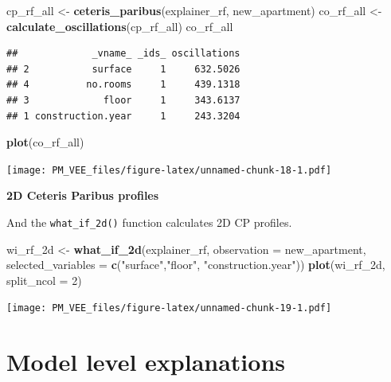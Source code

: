 \documentclass[]{book}
\newenvironment{Shaded}{\begin{snugshade}}{\end{snugshade}}
\newcommand{\DataTypeTok}[1]{\textcolor[rgb]{0.13,0.29,0.53}{#1}}
\newcommand{\DecValTok}[1]{\textcolor[rgb]{0.00,0.00,0.81}{#1}}
\newcommand{\KeywordTok}[1]{\textcolor[rgb]{0.13,0.29,0.53}{\textbf{#1}}}
\newcommand{\NormalTok}[1]{#1}
\newcommand{\StringTok}[1]{\textcolor[rgb]{0.31,0.60,0.02}{#1}}
\theoremstyle{definition}
\theoremstyle{definition}
\theoremstyle{definition}
\theoremstyle{remark}
\begin{document}
\begin{Shaded}
\begin{Highlighting}[]
\NormalTok{cp_rf_all <-}\StringTok{ }\KeywordTok{ceteris_paribus}\NormalTok{(explainer_rf, new_apartment)}
\NormalTok{co_rf_all <-}\StringTok{ }\KeywordTok{calculate_oscillations}\NormalTok{(cp_rf_all)}
\NormalTok{co_rf_all}
\end{Highlighting}
\end{Shaded}

\begin{verbatim}
##             _vname_ _ids_ oscillations
## 2           surface     1     632.5026
## 4          no.rooms     1     439.1318
## 3             floor     1     343.6137
## 1 construction.year     1     243.3204
\end{verbatim}

\begin{Shaded}
\begin{Highlighting}[]
\KeywordTok{plot}\NormalTok{(co_rf_all)}
\end{Highlighting}
\end{Shaded}

\texttt{[image: PM\_VEE\_files/figure-latex/unnamed-chunk-18-1.pdf]}

\textbf{2D Ceteris Paribus profiles}

And the \texttt{what\_if\_2d()} function calculates 2D CP profiles.

\begin{Shaded}
\begin{Highlighting}[]
\NormalTok{wi_rf_2d <-}\StringTok{ }\KeywordTok{what_if_2d}\NormalTok{(explainer_rf, }\DataTypeTok{observation =}\NormalTok{ new_apartment, }
                 \DataTypeTok{selected_variables =} \KeywordTok{c}\NormalTok{(}\StringTok{"surface"}\NormalTok{,}\StringTok{"floor"}\NormalTok{, }\StringTok{"construction.year"}\NormalTok{))}
\KeywordTok{plot}\NormalTok{(wi_rf_2d, }\DataTypeTok{split_ncol =} \DecValTok{2}\NormalTok{)}
\end{Highlighting}
\end{Shaded}

\texttt{[image: PM\_VEE\_files/figure-latex/unnamed-chunk-19-1.pdf]}

\hypertarget{model-level-explanations}{%
\chapter*{Model level explanations}\label{model-level-explanations}}
\end{document}
